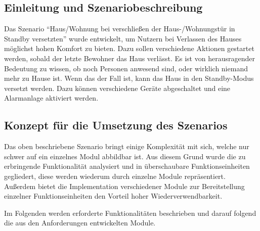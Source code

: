 \subsection{Einleitung und Szenariobeschreibung}
Das Szenario "`Haus/Wohnung bei verschließen der Haus-/Wohnungstür in Standby versetzten"' wurde entwickelt, um Nutzern bei Verlassen des Hauses möglichst hohen Komfort zu bieten. Dazu sollen verschiedene Aktionen gestartet werden, sobald der letzte Bewohner das Haus verlässt. Es ist von herausragender Bedeutung zu wissen, ob noch Personen anwesend sind, oder wirklich niemand mehr zu Hause ist. Wenn das der Fall ist, kann das Haus in den Standby-Modus versetzt werden. Dazu können verschiedene Geräte abgeschaltet und eine Alarmanlage aktiviert werden.

\subsection{Konzept für die Umsetzung des Szenarios}
Das oben beschriebene Szenario bringt einige Komplexität mit sich, welche nur schwer auf ein einzelnes Modul abbildbar ist. Aus diesem Grund wurde die zu erbringende Funktionalität analysiert und in überschaubare Funktionseinheiten gegliedert, diese werden wiederum durch einzelne Module repräsentiert. Außerdem bietet die Implementation verschiedener Module zur Bereitstellung einzelner Funktionseinheiten den Vorteil hoher Wiederverwendbarkeit.

Im Folgenden werden erforderte Funktionalitäten beschrieben und darauf folgend die aus den Anforderungen entwickelten Module.

